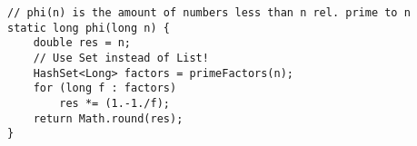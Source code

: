 \begin{verbatim}
// phi(n) is the amount of numbers less than n rel. prime to n
static long phi(long n) {
	double res = n;
	// Use Set instead of List!
	HashSet<Long> factors = primeFactors(n);
	for (long f : factors)
		res *= (1.-1./f);
	return Math.round(res);
}
\end{verbatim}